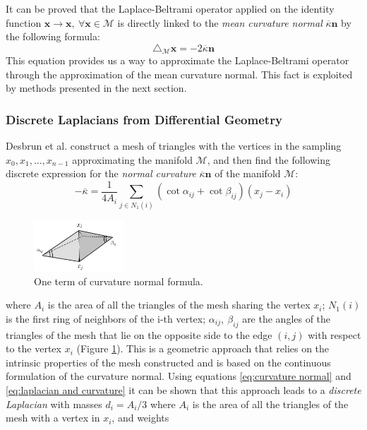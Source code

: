 It can be proved that the Laplace-Beltrami operator applied on the identity function $\mathbf x \rightarrow \mathbf x, \ \forall \mathbf x\in \mathcal M$ is directly linked to the \textit{mean curvature normal} $\overline{\kappa}\mathbf n$ by the following formula:
\begin{equation}\label{eq:laplacian and curvature}
	\triangle_\mathcal M \mathbf x  = -2\overline{\kappa}\mathbf n
\end{equation}
This equation provides us a way to approximate the Laplace-Beltrami operator through the approximation of the mean curvature normal. This fact is exploited by methods presented in the next section.



\subsubsection{Discrete Laplacians from Differential Geometry}
Desbrun et al. \cite{Desbrun1999} construct a mesh of triangles with the vertices in the sampling $x_0, x_1, ..., x_{n-1}$ approximating the manifold $\mathcal M$, and then find the following discrete expression for the \textit{normal curvature} $\overline{\kappa} \mathbf{n}$ of the manifold $\mathcal M$:
\begin{equation}\label{eq:curvature normal}
	-\overline{\kappa} =\frac{1}{4 A_i} \sum_{j \in N_{1}(i)}\left(\cot \alpha_{ij}+\cot \beta_{ij}\right)\left(x_{j}-x_{i}\right)
\end{equation}


\begin{figure}
	\label{fig:Desbrun}
	\begin{center}
		\includegraphics[width=0.3\textwidth]{figs/Chapter3/MyDesbrun.png}
	\end{center}
	\caption{One term of curvature normal formula.}
\end{figure} 
where $A_i$ is the area of all the triangles of the mesh sharing the vertex $x_i$; $N_1(i)$ is the first ring of neighbors of the i-th vertex; $\alpha_{i j},\ \beta_{i j}$ are the angles of the triangles of the mesh that lie on the opposite side to the edge $(i,j)$ with respect to the vertex $x_i$ (Figure \ref{fig:Desbrun}). This is a geometric approach that relies on the intrinsic properties of the mesh constructed and is based on the continuous formulation of the curvature normal. Using equations \ref{eq:curvature normal} and \ref{eq:laplacian and curvature} it can be shown \cite{REUTER2009381} that this approach leads to a \textit{discrete Laplacian} with masses $d_i=A_i/3$ where $A_i$ is the area of all the triangles of the mesh with a vertex in $x_i$, and weights

